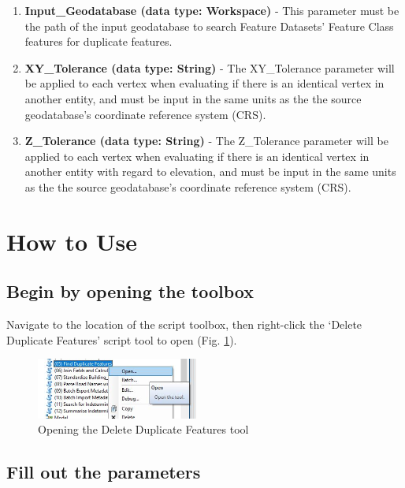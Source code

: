 \documentclass[openany]{book}
\providecommand{\tightlist}{%
  \setlength{\itemsep}{0pt}\setlength{\parskip}{0pt}}
\theoremstyle{definition}
\theoremstyle{definition}
\theoremstyle{definition}
\theoremstyle{remark}
\begin{document}
\begin{enumerate}
\def\labelenumi{\arabic{enumi}.}
\tightlist
\item
  \textbf{Input\_Geodatabase (data type: Workspace)} - This parameter
  must be the path of the input geodatabase to search Feature Datasets'
  Feature Class features for duplicate features.
\item
  \textbf{XY\_Tolerance (data type: String)} - The XY\_Tolerance
  parameter will be applied to each vertex when evaluating if there is
  an identical vertex in another entity, and must be input in the same
  units as the the source geodatabase's coordinate reference system
  (CRS).
\item
  \textbf{Z\_Tolerance (data type: String)} - The Z\_Tolerance parameter
  will be applied to each vertex when evaluating if there is an
  identical vertex in another entity with regard to elevation, and must
  be input in the same units as the the source geodatabase's coordinate
  reference system (CRS).
\end{enumerate}

\section{How to Use}\label{how-to-use-4}

\subsection{Begin by opening the
toolbox}\label{begin-by-opening-the-toolbox-4}

Navigate to the location of the script toolbox, then right-click the
`Delete Duplicate Features' script tool to open (Fig.
\ref{fig:delFopen}).

\begin{figure}[H]

{\centering \includegraphics[width=2.09in,]{figures/delF-opentool} 

}

\caption{Opening the Delete Duplicate Features tool}\label{fig:delFopen}
\end{figure}

\subsection{Fill out the parameters}\label{fill-out-the-parameters-4}
\end{document}
